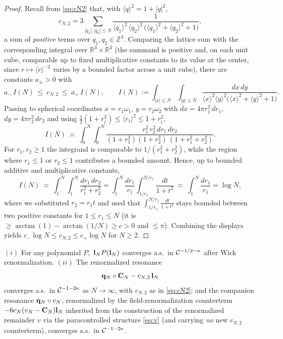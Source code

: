 \begin{proof}
Recall from \eqref{eq:cN2} that, with $\langle q\rangle^2=1+|q|^2$,
\[
c_{N,2}=3\sum_{|q_1|,|q_2|\le N}\frac{1}{\langle q_1\rangle^2\,\langle q_2\rangle^2\,\bigl(\langle q_1\rangle^2+\langle q_2\rangle^2+1\bigr)},
\]
a sum of \emph{positive} terms over $q_1,q_2\in\mathbb Z^3$. Comparing the lattice
sum with the corresponding integral over $\mathbb R^3\times\mathbb R^3$ (the summand
is positive and, on each unit cube, comparable up to fixed multiplicative constants
to its value at the center, since $r\mapsto\langle r\rangle^{-2}$ varies by a bounded
factor across a unit cube), there are constants $a_\pm>0$ with
\[
a_-\,I(N)\ \le\ c_{N,2}\ \le\ a_+\,I(N),\qquad
I(N):=\int_{|x|\le N}\!\!\int_{|y|\le N}\frac{dx\,dy}{\langle x\rangle^2\langle y\rangle^2\bigl(\langle x\rangle^2+\langle y\rangle^2+1\bigr)} .
\]
Passing to spherical coordinates $x=r_1\omega_1$, $y=r_2\omega_2$ with
$dx=4\pi r_1^2\,dr_1$, $dy=4\pi r_2^2\,dr_2$ and using
$\tfrac12(1+r_i^2)\le\langle r_i\rangle^2\le 1+r_i^2$,
\[
I(N)\ \asymp\ \int_0^N\!\!\int_0^N\frac{r_1^2\,r_2^2\,dr_1\,dr_2}{(1+r_1^2)(1+r_2^2)\,(1+r_1^2+r_2^2)} .
\]
For $r_1,r_2\ge1$ the integrand is comparable to $1/(r_1^2+r_2^2)$, while the region
where $r_1\le1$ or $r_2\le1$ contributes a bounded amount. Hence, up to bounded
additive and multiplicative constants,
\[
I(N)\ \asymp\ \int_1^N\!\!\int_1^N\frac{dr_1\,dr_2}{r_1^2+r_2^2}
=\int_1^N\frac{dr_1}{r_1}\int_{1/r_1}^{N/r_1}\frac{dt}{1+t^2}
\ \asymp\ \int_1^N\frac{dr_1}{r_1}=\log N,
\]
where we substituted $r_2=r_1 t$ and used that $\int_{1/r_1}^{N/r_1}\frac{dt}{1+t^2}$
stays bounded between two positive constants for $1\le r_1\le N$ (it is
$\ge\arctan(1)-\arctan(1/N)\ge c>0$ and $\le\pi$). Combining the displays yields
$c_-\log N\le c_{N,2}\le c_+\log N$ for $N\ge2$.
\end{proof}

\begin{qonelemma}\label{lem:std}
$(i)$ For any polynomial $P$, $\,\mathbf{l}_N P(\mathbf{l}_N)$ converges a.s.\ in
$\mathcal{C}^{-1/2-\kappa}$ after Wick renormalization. $(ii)$ The renormalized resonance
\[
\mathbf{q}_N\circ\mathbf{C}_N-c_{N,2}\,\mathbf{l}_N
\]
converges a.s.\ in $\mathcal{C}^{-1-2\kappa}$ as $N\to\infty$, with $c_{N,2}$ as in
\eqref{eq:cN2}; and the companion resonance $\mathbf{q}_N\circ v_N$, renormalized by the
field-renormalization counterterm $-6c_N(v_N-\mathbf{C}_N)\mathbf{l}_N$ inherited from the
construction of the renormalized remainder $v$ via the paracontrolled structure
\eqref{eq:v} (and carrying \emph{no} new $c_{N,2}$ counterterm), converges a.s.\ in
$\mathcal{C}^{-1-2\kappa}$.
\end{qonelemma}

